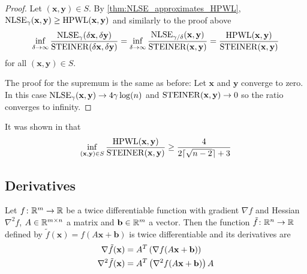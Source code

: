 \begin{proof}
 Let \((\mathbf{x}, \mathbf{y}) \in S \).
 By \cref{thm:NLSE_approximates_HPWL}, \(\operatorname{NLSE}_\gamma(\mathbf{x}, \mathbf{y}) \geq \operatorname{HPWL}(\mathbf{x}, \mathbf{y})\) and similarly to the proof above
 \[
      \inf_{\delta \to \infty} \frac{\operatorname{NLSE}_\gamma (\delta \mathbf{x}, \delta \mathbf{y})}{\operatorname{STEINER}(\delta \mathbf{x}, \delta \mathbf{y})} 
    = \inf_{\delta \to \infty} \frac{\operatorname{NLSE}_{\gamma/\delta} (\mathbf{x}, \mathbf{y})}{\operatorname{STEINER}(\mathbf{x}, \mathbf{y})}
    = \frac{\operatorname{HPWL}(\mathbf{x}, \mathbf{y})}{\operatorname{STEINER}(\mathbf{x}, \mathbf{y})}
 \]
 for all \((\mathbf{x}, \mathbf{y}) \in S \).
 
 The proof for the supremum is the same as before: 
 Let \(\mathbf{x}\) and \(\mathbf{y}\) converge to zero.
 In this case \(\operatorname{NLSE}_\gamma(\mathbf{x}, \mathbf{y}) \to 4 \gamma \log(n)\) and \(\operatorname{STEINER}(\mathbf{x}, \mathbf{y}) \to 0\) so the 
 ratio converges to infinity.
\end{proof}


\begin{remark}
 It was shown in \cite{BrennerVygen-WorstCaseRatiosOfNetworksInTheRectilinearPlane} that 
 \[\inf_{(\mathbf{x}, \mathbf{y}) \in S} \frac{\operatorname{HPWL}(\mathbf{x}, \mathbf{y})}{\operatorname{STEINER}(\mathbf{x}, \mathbf{y})} \geq \frac{4}{2 \lceil \sqrt{n-2} \rceil + 3} \]
\end{remark}



\subsection{Derivatives} \label{sec:NLSE_derivatives}

\begin{lemma} \label{thm:derivatives_after_affine_transformation}
 Let \(f \colon \mathbb{R}^m \to \mathbb{R}\) be a twice differentiable function with gradient \(\nabla f\) and Hessian \(\nabla^2 f\),
 \(A \in \mathbb{R}^{m \times n}\) a matrix and \(\mathbf{b} \in \mathbb{R}^m\) a vector.
 Then the function \(\tilde{f} \colon \mathbb{R}^n \to \mathbb{R}\) defined by
 \( \tilde{f}(\mathbf{x}) = f(A\mathbf{x} + \mathbf{b}) \)
 is twice differentiable and its derivatives are
 \begin{align*}
  \nabla \tilde{f} (\mathbf{x})   &= A^T \left({\nabla f(A\mathbf{x} + \mathbf{b})}\right) \\
  \nabla^2 \tilde{f} (\mathbf{x}) &= A^T \left({\nabla^2 f(A\mathbf{x} + \mathbf{b})}\right) A
 \end{align*}
\end{lemma}

